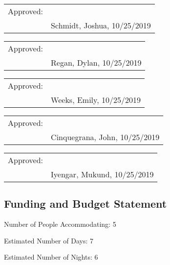 \documentclass{article}
\let\Oldsubsection\subsection
\renewcommand{\subsection}{\FloatBarrier\Oldsubsection}
\begin{document}
\bigskip
\bigskip

\begin{tabular}{@{}p{.5in}p{3.5in}@{}}
Approved: & \hrulefill \\
& Schmidt, Joshua, 10/25/2019\\
\end{tabular}

\bigskip
\bigskip

\begin{tabular}{@{}p{.5in}p{3.5in}@{}}
Approved: & \hrulefill \\
& Regan, Dylan, 10/25/2019\\
\end{tabular}

\bigskip
\bigskip

\begin{tabular}{@{}p{.5in}p{3.5in}@{}}
Approved: & \hrulefill \\
& Weeks, Emily, 10/25/2019\\
\end{tabular}

\bigskip
\bigskip

\begin{tabular}{@{}p{.5in}p{3.5in}@{}}
Approved: & \hrulefill \\
& Cinquegrana, John, 10/25/2019\\
\end{tabular}

\bigskip
\bigskip

\begin{tabular}{@{}p{.5in}p{3.5in}@{}}
Approved: & \hrulefill \\
& Iyengar, Mukund, 10/25/2019\\
\end{tabular}

\fi

\newpage

\subsection{Funding and Budget Statement}

\bigskip

\hspace{1.275cm} Number of People Accommodating: 5

\bigskip

Estimated Number of Days: 7

\bigskip

Estimated Number of Nights: 6
\end{document}
